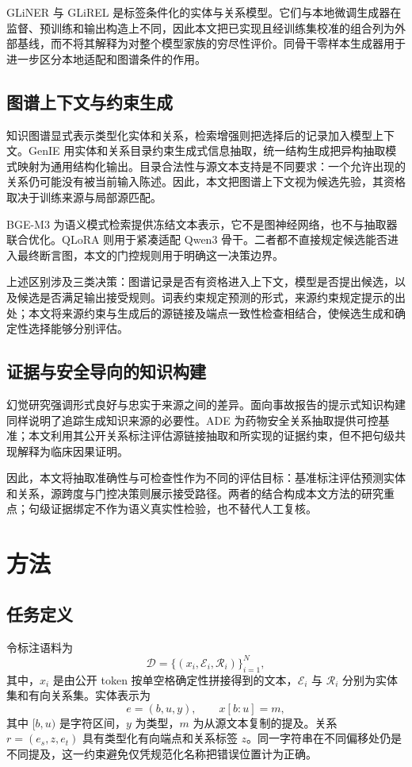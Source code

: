 \documentclass[UTF8,a4paper,twocolumn,10pt]{ctexart}
\begin{document}
GLiNER 与 GLiREL 是标签条件化的实体与关系模型\cite{zaratiana2024gliner,boylan2025glirel}。它们与本地微调生成器在监督、预训练和输出构造上不同，因此本文把已实现且经训练集校准的组合列为外部基线，而不将其解释为对整个模型家族的穷尽性评价。同骨干零样本生成器用于进一步区分本地适配和图谱条件的作用。

\subsection{图谱上下文与约束生成}
知识图谱显式表示类型化实体和关系，检索增强则把选择后的记录加入模型上下文\cite{hogan2021kg,lewis2020rag}。GenIE 用实体和关系目录约束生成式信息抽取，统一结构生成把异构抽取模式映射为通用结构化输出\cite{josifoski2022genie,lu2022uie}。目录合法性与源文本支持是不同要求：一个允许出现的关系仍可能没有被当前输入陈述。因此，本文把图谱上下文视为候选先验，其资格取决于训练来源与局部源匹配。

BGE-M3 为语义模式检索提供冻结文本表示\cite{chen2024bgem3}，它不是图神经网络，也不与抽取器联合优化。QLoRA 则用于紧凑适配 Qwen3 骨干\cite{dettmers2023qlora,qwen2025qwen3}。二者都不直接规定候选能否进入最终断言图，本文的门控规则用于明确这一决策边界。

上述区别涉及三类决策：图谱记录是否有资格进入上下文，模型是否提出候选，以及候选是否满足输出接受规则。词表约束规定预测的形式，来源约束规定提示的出处；本文将来源约束与生成后的源链接及端点一致性检查相结合，使候选生成和确定性选择能够分别评估。

\subsection{证据与安全导向的知识构建}
幻觉研究强调形式良好与忠实于来源之间的差异\cite{ji2023hallucination}。面向事故报告的提示式知识构建同样说明了追踪生成知识来源的必要性\cite{liu2025llmaccidentkg}。ADE 为药物安全关系抽取提供可控基准；本文利用其公开关系标注评估源链接抽取和所实现的证据约束，但不把句级共现解释为临床因果证明。

因此，本文将抽取准确性与可检查性作为不同的评估目标：基准标注评估预测实体和关系，源跨度与门控决策则展示接受路径。两者的结合构成本文方法的研究重点；句级证据绑定不作为语义真实性检验，也不替代人工复核。

\section{方法}
\subsection{任务定义}
令标注语料为
\begin{equation}
\mathcal D=\{(x_i,\mathcal E_i,\mathcal R_i)\}_{i=1}^{N},
\label{zh:eq:dataset}
\end{equation}
其中，$x_i$ 是由公开 token 按单空格确定性拼接得到的文本，$\mathcal E_i$ 与 $\mathcal R_i$ 分别为实体集和有向关系集。实体表示为
\begin{equation}
e=(b,u,y),\qquad x[b:u]=m,
\label{zh:eq:entity}
\end{equation}
其中 $[b,u)$ 是字符区间，$y$ 为类型，$m$ 为从源文本复制的提及。关系 $r=(e_s,z,e_t)$ 具有类型化有向端点和关系标签 $z$。同一字符串在不同偏移处仍是不同提及，这一约束避免仅凭规范化名称把错误位置计为正确。
\end{document}
